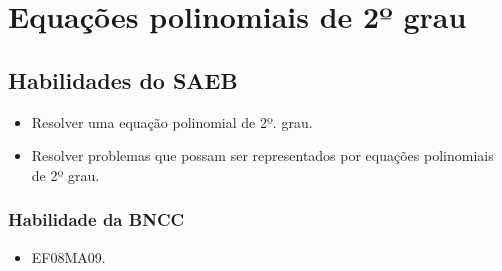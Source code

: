















\chapter{Equações polinomiais de 2º grau}

\section{Habilidades do SAEB} 


\begin{itemize}
\item
  Resolver uma equação polinomial de 2º. grau.
\item
  Resolver problemas que possam ser representados por equações
  polinomiais de 2º grau.
\end{itemize}

\subsection{Habilidade da BNCC}

\begin{itemize}
 \item EF08MA09.
\end{itemize}

